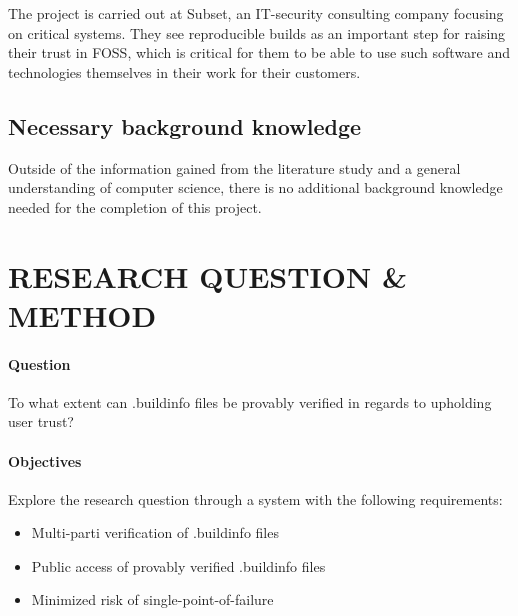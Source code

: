 \documentclass{article}
\begin{document}
The project is carried out at Subset, an IT-security consulting company focusing on critical systems. They see reproducible builds as an important step for raising their trust in FOSS, which is critical for them to be able to use such software and technologies themselves in their work for their customers.



\subsection*{Necessary background knowledge}

Outside of the information gained from the literature study and a general understanding of computer science, there is no additional background knowledge needed for the completion of this project. 

\section*{RESEARCH QUESTION \& METHOD}

\paragraph{Question} To what extent can .buildinfo files be provably verified in regards to upholding user trust?

\paragraph{Objectives} Explore the research question through a system with the following requirements:

\begin{itemize}
	\item Multi-parti verification of .buildinfo files
	\item Public access of provably verified .buildinfo files
	\item Minimized risk of single-point-of-failure
\end{itemize}
\end{document}
